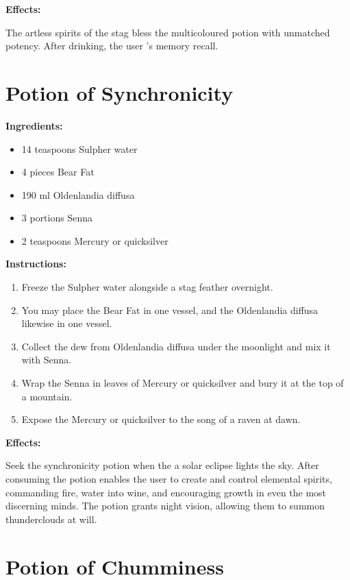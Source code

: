 \documentclass{article}
\begin{document}
\textbf{Effects:}

The artless spirits of the stag bless the multicoloured potion with unmatched potency. After drinking, the user 's memory recall.

\newpage
\section*{Potion of Synchronicity}

\textbf{Ingredients:}

\begin{itemize}
  \item 14 teaspoons Sulpher water
  \item 4 pieces Bear Fat
  \item 190 ml Oldenlandia diffusa
  \item 3 portions Senna
  \item 2 teaspoons Mercury or quicksilver
\end{itemize}

\textbf{Instructions:}

\begin{enumerate}
  \item Freeze the Sulpher water alongside a stag feather overnight.
  \item You may place the Bear Fat in one vessel, and the Oldenlandia diffusa likewise in one vessel.
  \item Collect the dew from Oldenlandia diffusa under the moonlight and mix it with Senna.
  \item Wrap the Senna in leaves of Mercury or quicksilver and bury it at the top of a mountain.
  \item Expose the Mercury or quicksilver to the song of a raven at dawn.
\end{enumerate}

\textbf{Effects:}

Seek the synchronicity potion when the a solar eclipse lights the sky. After consuming the potion enables the user to create and control elemental spirits, commanding fire, water into wine, and encouraging growth in even the most discerning minds. The potion grants night vision, allowing them to summon thunderclouds at will.

\newpage
\section*{Potion of Chumminess}
\end{document}
